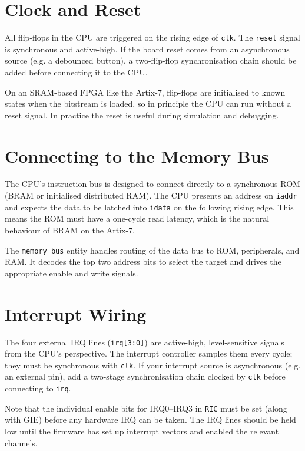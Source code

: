 \documentclass[a4paper,12pt]{report}
\newcommand{\asm}[1]{\texttt{#1}}
\newcommand{\signal}[1]{\texttt{#1}}
\begin{document}
\section{Clock and Reset}

All flip-flops in the CPU are triggered on the rising edge of \signal{clk}. The \signal{reset} signal is synchronous and active-high. If the board reset comes from an asynchronous source (e.g. a debounced button), a two-flip-flop synchronisation chain should be added before connecting it to the CPU.

On an SRAM-based FPGA like the Artix-7, flip-flops are initialised to known states when the bitstream is loaded, so in principle the CPU can run without a reset signal. In practice the reset is useful during simulation and debugging.

\section{Connecting to the Memory Bus}

The CPU's instruction bus is designed to connect directly to a synchronous ROM (BRAM or initialised distributed RAM). The CPU presents an address on \signal{iaddr} and expects the data to be latched into \signal{idata} on the following rising edge. This means the ROM must have a one-cycle read latency, which is the natural behaviour of BRAM on the Artix-7.

The \texttt{memory\_bus} entity handles routing of the data bus to ROM, peripherals, and RAM. It decodes the top two address bits to select the target and drives the appropriate enable and write signals.

\section{Interrupt Wiring}

The four external IRQ lines (\signal{irq[3:0]}) are active-high, level-sensitive signals from the CPU's perspective. The interrupt controller samples them every cycle; they must be synchronous with \signal{clk}. If your interrupt source is asynchronous (e.g. an external pin), add a two-stage synchronisation chain clocked by \signal{clk} before connecting to \signal{irq}.

Note that the individual enable bits for IRQ0--IRQ3 in \asm{RIC} must be set (along with GIE) before any hardware IRQ can be taken. The IRQ lines should be held low until the firmware has set up interrupt vectors and enabled the relevant channels.
\end{document}
